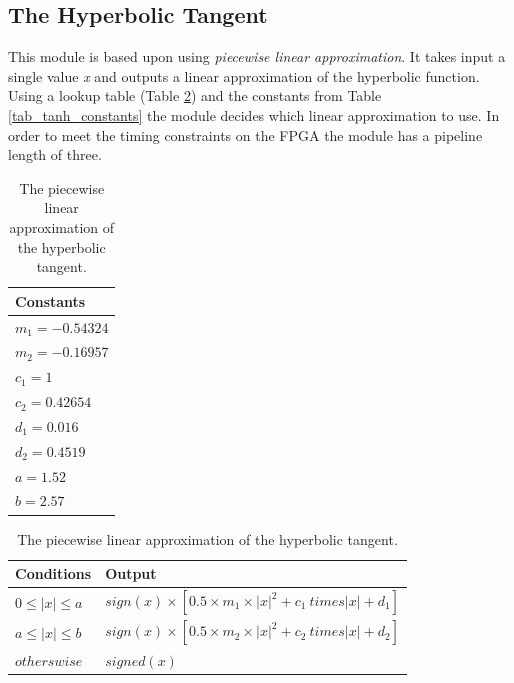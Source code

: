 
\subsection{The Hyperbolic Tangent} 

This module is based upon \cite{XXXXXXXXXX} using \textit{piecewise linear approximation}. It takes input a single value \textit{x} and outputs a linear approximation of the hyperbolic function. Using a lookup table (Table \ref{tab_tanh}) and the constants from Table \ref{tab_tanh_constants} the module decides which linear approximation to use. 
In order to meet the timing constraints on the FPGA the module has a pipeline length of three. 

\begin{table}
	\centering
    \begin{tabular}{| >{\centering\arraybackslash}m{1.2in} |} 
    \hline
    Constants \\ \hline
    $ m_1 = -0.54324 $ \\ \hline
    $ m_2 = -0.16957 $ \\ \hline
    $ c_1 = 1 $ \\ \hline
    $ c_2 = 0.42654 $ \\ \hline
    $ d_1 = 0.016 $ \\ \hline
    $ d_2 = 0.4519 $ \\ \hline
    $ a = 1.52 $ \\ \hline
    $ b = 2.57 $ \\ \hline
        \end{tabular}
    \caption{The constant used for the hyperbolic tangent approximation.}
   	\label{tab_tanh_constants}
    
    
	\centering
    \begin{tabular}{| >{\centering\arraybackslash}m{1.2in} | >{\centering\arraybackslash}m{2.5in} |} 
    \hline
    Conditions & Output \\ \hline
    $ 0 \le |x| \le a $ & $ sign(x) \times [0.5 \times m_1 \times |x|^2 + c_1 \ times |x| + d_1] $\\ \hline
    $ a \le |x| \le b $ & $ sign(x) \times [0.5 \times m_2 \times |x|^2 + c_2 \ times |x| + d_2] $\\ \hline
   	$ otherswise $ & $ signed(x) $\\ \hline
        \end{tabular}
    \caption{The piecewise linear approximation of the hyperbolic tangent.}
   	\label{tab_tanh}
    
\end{table}

